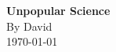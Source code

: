 \begin{titlepage}
    \centering
    \vspace*{2in}
    {\Huge \textbf{Unpopular Science}} \\[2em]
    {\Large By David} \\[3em]
    {\large \today}
\end{titlepage}
